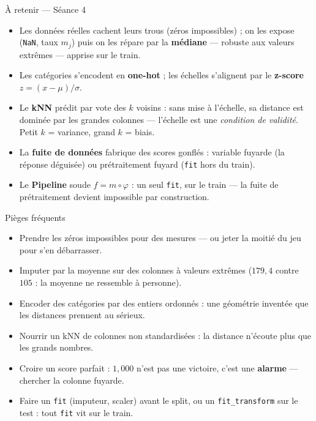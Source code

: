 \documentclass[aspectratio=169,11pt]{beamer}
\begin{document}
\begin{frame}{À retenir — Séance 4}
\begin{ucadret}[L'essentiel]
\begin{itemize}\small
  \item Les données réelles cachent leurs trous (zéros impossibles) ; on les expose (\texttt{NaN}, taux $m_j$) puis on les répare par la \textbf{médiane} — robuste aux valeurs extrêmes — apprise sur le train.
  \item Les catégories s'encodent en \textbf{one-hot} ; les échelles s'alignent par le \textbf{z-score} $z = (x-\mu)/\sigma$.
  \item Le \textbf{kNN} prédit par vote des $k$ voisins : sans mise à l'échelle, sa distance est dominée par les grandes colonnes — l'échelle est une \emph{condition de validité}. Petit $k$ = variance, grand $k$ = biais.
  \item La \textbf{fuite de données} fabrique des scores gonflés : variable fuyarde (la réponse déguisée) ou prétraitement fuyard (\texttt{fit} hors du train).
  \item Le \textbf{Pipeline} soude $f = m \circ \varphi$ : un seul \texttt{fit}, sur le train — la fuite de prétraitement devient impossible par construction.
\end{itemize}
\end{ucadret}
\end{frame}

\begin{frame}{Pièges fréquents}
\begin{itemize}\small
  \item Prendre les zéros impossibles pour des mesures — ou jeter la moitié du jeu pour s'en débarrasser.
  \item Imputer par la moyenne sur des colonnes à valeurs extrêmes ($179{,}4$ contre $105$ : la moyenne ne ressemble à personne).
  \item Encoder des catégories par des entiers ordonnés : une géométrie inventée que les distances prennent au sérieux.
  \item Nourrir un kNN de colonnes non standardisées : la distance n'écoute plus que les grands nombres.
  \item Croire un score parfait : $1{,}000$ n'est pas une victoire, c'est une \textbf{alarme} — chercher la colonne fuyarde.
  \item Faire un \texttt{fit} (imputeur, scaler) avant le split, ou un \texttt{fit\_transform} sur le test : tout \texttt{fit} vit sur le train.
\end{itemize}
\end{frame}
\end{document}
